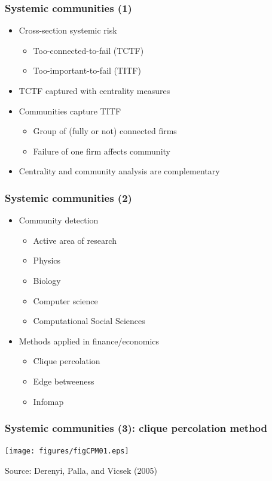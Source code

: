 \documentclass[aspectratio=43,dvipsnames,usenames, svgnames]{beamer}
\begin{document}
\begin{frame} %
\frametitle{Systemic communities (1)}
\begin{itemize}
	\item Cross-section systemic risk
		\begin{itemize}
			\item Too-connected-to-fail (TCTF)
			\item Too-important-to-fail (TITF)
		\end{itemize}
	\smallskip
	\item TCTF captured with centrality measures
	\smallskip
	\item Communities capture TITF
		\begin{itemize}
			\item Group of (fully or not) connected firms
			\item Failure of one firm affects community
		\end{itemize}
	\item Centrality and community analysis are complementary
\end{itemize}
\end{frame}

\begin{frame} %
\frametitle{Systemic communities (2)}
\begin{itemize}
	\item Community detection 
		\begin{itemize}
			\item Active area of research 
			\item Physics
			\item Biology
			\item Computer science
			\item Computational Social Sciences
		\end{itemize}
	\smallskip
	\item Methods applied in finance/economics
		\begin{itemize}
			\item Clique percolation
			\item Edge betweeness
			\item Infomap
		\end{itemize}
\end{itemize}
\end{frame}

\begin{frame} %
\frametitle{Systemic communities (3): clique percolation method}
\begin{center}
	\texttt{[image: figures/figCPM01.eps]}
\end{center}
\tiny{Source: Derenyi, Palla, and Vicsek (2005) }
\end{frame}
\end{document}
